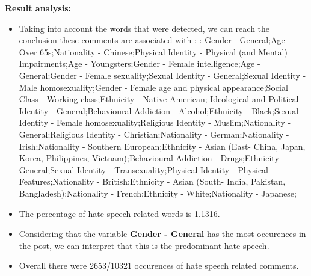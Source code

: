 \documentclass[11pt]{article}
\newlength\mylength
\begin{document}
\begin{center}
\begin{longtable}{|C{.50\mylength}|C{.30\mylength}|C{.15\mylength}|C{.15\mylength}|C{.15\mylength}|}
\end{longtable}
\end{center}


\textbf{\Large Result analysis:}

\begin{itemize}\item Taking into account the words that were detected, we can reach the conclusion these comments are associated with : : Gender - General;Age - Over 65s;Nationality - Chinese;Physical Identity - Physical (and Mental) Impairments;Age - Youngsters;Gender - Female intelligence;Age - General;Gender - Female sexuality;Sexual Identity - General;Sexual Identity - Male homosexuality;Gender - Female age and physical appearance;Social Class - Working class;Ethnicity - Native-American; Ideological and Political Identity - General;Behavioural Addiction - Alcohol;Ethnicity - Black;Sexual Identity - Female homosexuality;Religious Identity - Muslim;Nationality - General;Religious Identity - Christian;Nationality - German;Nationality - Irish;Nationality - Southern European;Ethnicity - Asian (East- China, Japan, Korea, Philippines, Vietnam);Behavioural Addiction - Drugs;Ethnicity - General;Sexual Identity - Transexuality;Physical Identity - Physical Features;Nationality - British;Ethnicity - Asian (South- India, Pakistan, Bangladesh);Nationality - French;Ethnicity - White;Nationality - Japanese;%

\item The percentage of hate speech related words is 1.1316.

\item Considering that the variable \textbf{Gender - General} has the most occurences in the post, we can interpret that this is the predominant hate speech.

\item Overall there were 2653/10321 occurences of hate speech related comments.\end{itemize}
\end{document}

